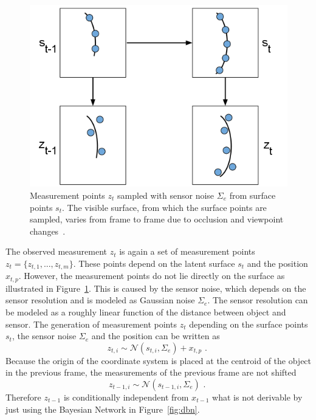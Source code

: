\documentclass[twoside,a4paper,article]{combine}
\begin{document}
\begin{figure}
  \center
  \includegraphics[width=\linewidth]{surface-measurement}
  \caption{Measurement points $z_t$ sampled with sensor noise
    $\Sigma_e$ from surface points $s_t$. The visible surface, from which the
    surface points are sampled, varies from frame to frame due to
    occlusion and viewpoint changes~\cite{paper}.}
  \label{fig:surface-measurement}
\end{figure}

The observed measurement $z_t$ is again a set of measurement points
$z_t=\{z_{t,1}, ..., z_{t,m}\}$. These points depend on the latent
surface $s_t$ and the position $x_{t,p}$. However, the measurement
points do not lie directly on the surface as illustrated in
Figure~\ref{fig:surface-measurement}. This is caused by the sensor
noise, which depends on the sensor resolution and is modeled as
Gaussian noise $\Sigma_e$. The sensor resolution can be modeled as a
roughly linear function of the distance between object and sensor. The
generation of measurement points $z_t$ depending on the surface points
$s_t$, the sensor noise $\Sigma_e$ and the position can be written as
\begin{equation}
z_{t,i} \sim \mathcal{N}(s_{t,i},\Sigma_e) + x_{t,p} \mbox{ . }
\end{equation}
Because the origin of the coordinate system is placed at the centroid
of the object in the previous frame, the measurements of the previous
frame are not shifted
\begin{equation}
z_{t-1,i} \sim \mathcal{N}(s_{t-1,i},\Sigma_e) \mbox{ . }
\end{equation}
Therefore $z_{t-1}$ is conditionally independent from $x_{t-1}$ what
is not derivable by just using the Bayesian Network in
Figure~\ref{fig:dbn}.
\end{document}
